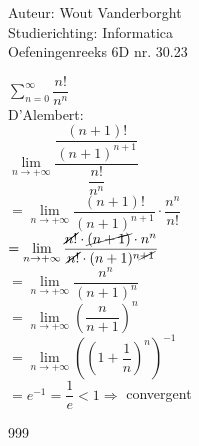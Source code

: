\documentclass[a4paper]{article}
\newcommand{\Limit}{\lim\limits_}
\begin{document}
  
\noindent \large Auteur: Wout Vanderborght\\
\noindent \large Studierichting: Informatica\\
\noindent \large Oefeningenreeks 6D nr. 30.23\\

\medskip

\normalsize

$ \displaystyle\sum_{n=0}^{\infty} \dfrac{n!}{n^n} $ \\

D'Alembert: \\

$ \Limit{n \rightarrow +\infty} \dfrac{\dfrac{(n+1)!}{(n+1)^{n+1}}}{\dfrac{n!}{n^n}} $ \\

$ = \Limit{n \rightarrow +\infty} \dfrac{(n+1)!}{(n+1)^{n+1}} \cdot \dfrac{n^n}{n!} $ \\

$ = \Limit{n \rightarrow +\infty} \dfrac{\cancel{n!} \cdot \cancel{(n+1)} \cdot n^n}{\cancel{n!} \cdot (n+1)^{n \cancel{+1}}} $ \\

$ = \Limit{n \rightarrow +\infty} \dfrac{n^n}{(n+1)^{n}} $ \\

$ = \Limit{n \rightarrow +\infty} \left( \dfrac{n}{n+1} \right)^{n} $ \\

$ = \Limit{n \rightarrow +\infty} \left( \left( 1 + \dfrac{1}{n} \right)^n \right)^{-1} $ \\

$ = e^{-1} = \dfrac{1}{e} < 1 \Rightarrow $ convergent \\ 

\begin{thebibliography}{999}
\end{thebibliography}
\end{document}
